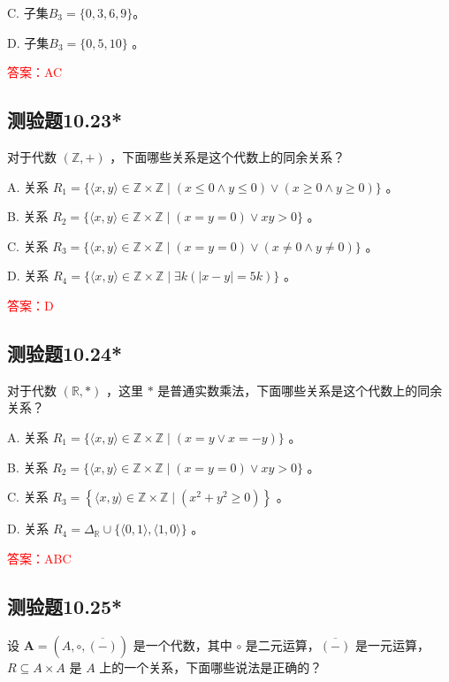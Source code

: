 \documentclass[UTF8, heading=true]{ctexart}
\begin{document}
C. 子集$B_3 = \{0,3,6,9\}$。

D. 子集$B_3 =\{0,5,10\}$ 。

\textcolor{red}{答案：AC}

\subsection{测验题10.23*}

对于代数 $(\mathbb{Z},+)$ ，下面哪些关系是这个代数上的同余关系？

A. 关系 $R_1=\{\langle x, y\rangle \in \mathbb{Z} \times \mathbb{Z} \mid(x \leq 0 \wedge y \leq 0) \vee(x \geq 0 \wedge y \geq 0)\}$ 。

B. 关系 $R_2=\{\langle x, y\rangle \in \mathbb{Z} \times \mathbb{Z} \mid(x=y=0) \vee x y>0\}$ 。

C. 关系 $R_3=\{\langle x, y\rangle \in \mathbb{Z} \times \mathbb{Z} \mid(x=y=0) \vee(x \neq 0 \wedge y \neq 0)\}$ 。

D. 关系 $R_4=\{\langle x, y\rangle \in \mathbb{Z} \times \mathbb{Z} \mid \exists k(|x-y|=5 k)\}$ 。


\textcolor{red}{答案：D}

\subsection{测验题10.24*}

对于代数 $(\mathbb{R}, *)$ ，这里 $*$ 是普通实数乘法，下面哪些关系是这个代数上的同余关系？

A. 关系 $R_1=\{\langle x, y\rangle \in \mathbb{Z} \times \mathbb{Z} \mid(x=y \vee x=-y)\}$ 。

B. 关系 $R_2=\{\langle x, y\rangle \in \mathbb{Z} \times \mathbb{Z} \mid(x=y=0) \vee x y>0\}$ 。

C. 关系 $R_3=\left\{\langle x, y\rangle \in \mathbb{Z} \times \mathbb{Z} \mid\left(x^2+y^2 \geq 0\right)\right\}$ 。

D. 关系 $R_4=\Delta_{\mathbb{R}} \cup\{\langle 0,1\rangle,\langle 1,0\rangle\}$ 。


\textcolor{red}{答案：ABC}

\subsection{测验题10.25*}

设 $\mathbf{A}=(A, \circ, \overline{(-)})$ 是一个代数，其中 $\circ$ 是二元运算，$\overline{(-)}$ 是一元运算，$R \subseteq A \times A$ 是 $A$ 上的一个关系，下面哪些说法是正确的？
\end{document}
